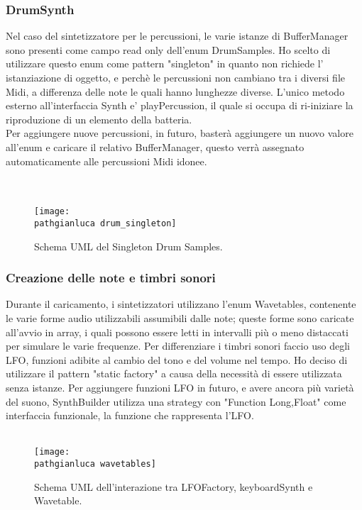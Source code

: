 \documentclass[a4paper,12pt]{report}
\newcommand\pathgianluca{img/gianluca/}
\begin{document}
\subsubsection{DrumSynth}
Nel caso del sintetizzatore per le percussioni, le varie istanze di BufferManager sono presenti come campo read only dell'enum DrumSamples. Ho scelto di utilizzare questo enum come pattern "singleton" in quanto non richiede l' istanziazione di oggetto, e perchè le percussioni non cambiano tra i diversi file Midi, a differenza delle note le quali hanno lunghezze diverse.
L'unico metodo esterno all'interfaccia Synth e' playPercussion, il quale si occupa di ri-iniziare la riproduzione di un elemento della batteria. \\
Per aggiungere nuove percussioni, in futuro, basterà aggiungere un nuovo valore all'enum e caricare il relativo BufferManager, questo verrà assegnato automaticamente alle percussioni Midi idonee.
\\ \\ \\
\begin{figure}[!htb]
	\centerline{\texttt{[image: \\pathgianluca drum\_singleton]}}
	\caption{Schema UML del Singleton Drum Samples.}
	\label{img:drumSingleton}
\end{figure}
\clearpage
\subsubsection{Creazione delle note e timbri sonori}
Durante il caricamento, i sintetizzatori utilizzano l'enum Wavetables, contenente le varie forme audio utilizzabili assumibili dalle note; queste forme sono caricate all'avvio in array, i quali possono essere letti in intervalli più o meno distaccati per simulare le varie frequenze.
Per differenziare i timbri sonori faccio uso degli LFO, funzioni adibite al cambio del tono e del volume nel tempo. Ho deciso di utilizzare il pattern "static factory" a causa della necessità di essere utilizzata senza istanze.
Per aggiungere funzioni LFO in futuro, e avere ancora più varietà del suono,
SynthBuilder utilizza una strategy con "Function Long,Float" come interfaccia funzionale, la funzione che rappresenta l'LFO. 
\\ \\
\begin{figure}[!htb]
	\centerline{\texttt{[image: \\pathgianluca wavetables]}}
	\caption{Schema UML dell'interazione tra LFOFactory, keyboardSynth e Wavetable.}
	\label{img:wavetables}
\end{figure}
\clearpage
\end{document}

